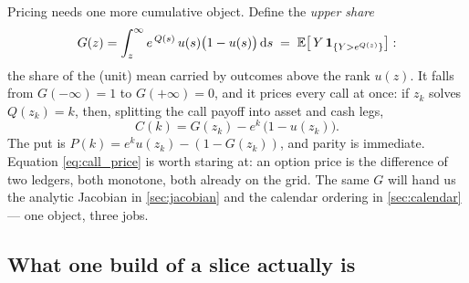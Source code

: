 \documentclass[11pt]{article}
\begin{document}
Pricing needs one more cumulative object.  Define the \emph{upper share}
\begin{equation}
G(z)=\int_{z}^{\infty}e^{\,Q(s)}\,u(s)\big(1-u(s)\big)\,\mathrm{d} s
\;=\;\mathbb{E}\big[\,Y\,\mathbf{1}_{\{Y>e^{Q(z)}\}}\big]:
\label{eq:upper_share}
\end{equation}
the share of the (unit) mean carried by outcomes above the rank $u(z)$.  It
falls from $G(-\infty)=1$ to $G(+\infty)=0$, and it prices every call at
once: if $z_k$ solves $Q(z_k)=k$, then, splitting the call payoff into asset
and cash legs,
\begin{equation}
C(k)=G(z_k)-e^{k}\,\big(1-u(z_k)\big).
\label{eq:call_price}
\end{equation}
The put is $P(k)=e^{k}u(z_k)-(1-G(z_k))$, and parity is immediate.  Equation
\eqref{eq:call_price} is worth staring at: an option price is the difference
of two ledgers, both monotone, both already on the grid.  The same $G$ will
hand us the analytic Jacobian in \cref{sec:jacobian} and the calendar
ordering in \cref{sec:calendar} --- one object, three jobs.

\subsection{What one build of a slice actually is}
\label{sec:quadrature}
\end{document}
